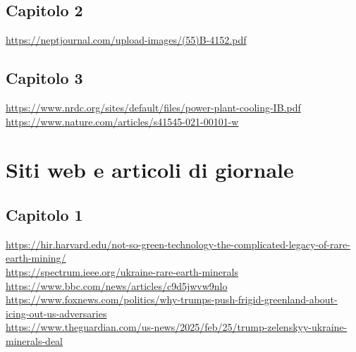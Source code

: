 \documentclass[12pt,a4paper,oneside]{book}
\begin{document}
\subsection*{Capitolo 2}
\url{https://neptjournal.com/upload-images/(55)B-4152.pdf}

\subsection*{Capitolo 3}
\url{https://www.nrdc.org/sites/default/files/power-plant-cooling-IB.pdf}\\
\url{https://www.nature.com/articles/s41545-021-00101-w}

\section*{Siti web e articoli di giornale}
\subsection*{Capitolo 1}
\url{https://hir.harvard.edu/not-so-green-technology-the-complicated-legacy-of-rare-earth-mining/} \\
\url{https://spectrum.ieee.org/ukraine-rare-earth-minerals} \\
\url{https://www.bbc.com/news/articles/c9d5jwvw9nlo} \\
\url{https://www.foxnews.com/politics/why-trumps-push-frigid-greenland-about-icing-out-us-adversaries} \\
\url{https://www.theguardian.com/us-news/2025/feb/25/trump-zelenskyy-ukraine-minerals-deal}
\end{document}
